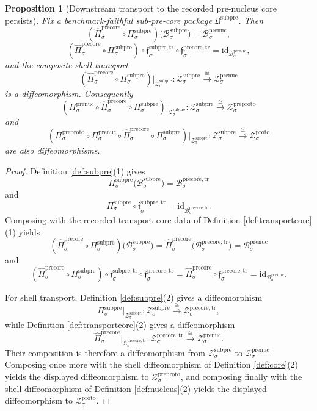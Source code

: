 \documentclass[11pt]{article}
\newcommand{\ProtoShellSet}[1]{\mathcal Z_{#1}^{\mathrm{proto}}}
\newcommand{\PreProtoProj}[1]{\Pi_{#1}^{\mathrm{preproto}}}
\newcommand{\PreProtoShellSet}[1]{\mathcal Z_{#1}^{\mathrm{preproto}}}
\newcommand{\PreNucBody}[1]{\mathcal B_{#1}^{\mathrm{prenuc}}}
\newcommand{\PreNucProj}[1]{\Pi_{#1}^{\mathrm{prenuc}}}
\newcommand{\PreNucShellSet}[1]{\mathcal Z_{#1}^{\mathrm{prenuc}}}
\newcommand{\PreCoreTrBody}[1]{\mathcal B_{#1}^{\mathrm{precore,tr}}}
\newcommand{\PreCoreTrProj}[1]{\widehat{\Pi}_{#1}^{\mathrm{precore}}}
\newcommand{\PreCoreTrLift}[1]{\mathfrak f_{#1}^{\mathrm{precore,tr}}}
\newcommand{\PreCoreTrShell}[1]{\mathcal Z_{#1}^{\mathrm{precore,tr}}}
\newcommand{\SubPreCorePackage}{\mathfrak U^{\mathrm{subpre}}}
\newcommand{\SubPreCoreBody}[1]{\mathcal B_{#1}^{\mathrm{subpre}}}
\newcommand{\SubPreCoreProj}[1]{\Pi_{#1}^{\mathrm{subpre}}}
\newcommand{\SubPreCoreTransportMin}[1]{\mathfrak f_{#1}^{\mathrm{subpre,tr}}}
\newcommand{\SubPreCoreShellSet}[1]{\mathcal Z_{#1}^{\mathrm{subpre}}}
\newtheorem{proposition}{Proposition}
\begin{document}
\begin{proposition}[Downstream transport to the recorded pre-nucleus core persists]
\label{prop:downstream}
Fix a benchmark-faithful sub-pre-core package \(\SubPreCorePackage\). Then
\[
(\PreCoreTrProj{\sigma}\circ\SubPreCoreProj{\sigma})\bigl(\SubPreCoreBody{\sigma}\bigr)
=
\PreNucBody{\sigma},
\]
\[
(\PreCoreTrProj{\sigma}\circ\SubPreCoreProj{\sigma})\circ
\SubPreCoreTransportMin{\sigma}\circ\PreCoreTrLift{\sigma}
=
\mathrm{id}_{\PreNucBody{\sigma}},
\]
and the composite shell transport
\[
(\PreCoreTrProj{\sigma}\circ\SubPreCoreProj{\sigma})\big|_{\SubPreCoreShellSet{\sigma}}
:
\SubPreCoreShellSet{\sigma}
\xrightarrow{\cong}
\PreNucShellSet{\sigma}
\]
is a diffeomorphism. Consequently
\[
(\PreNucProj{\sigma}\circ\PreCoreTrProj{\sigma}\circ\SubPreCoreProj{\sigma})\big|_{\SubPreCoreShellSet{\sigma}}
:
\SubPreCoreShellSet{\sigma}
\xrightarrow{\cong}
\PreProtoShellSet{\sigma}
\]
and
\[
(\PreProtoProj{\sigma}\circ\PreNucProj{\sigma}\circ\PreCoreTrProj{\sigma}\circ\SubPreCoreProj{\sigma})\big|_{\SubPreCoreShellSet{\sigma}}
:
\SubPreCoreShellSet{\sigma}
\xrightarrow{\cong}
\ProtoShellSet{\sigma}
\]
are also diffeomorphisms.
\end{proposition}

\begin{proof}
Definition \ref{def:subpre}(1) gives
\[
\SubPreCoreProj{\sigma}\bigl(\SubPreCoreBody{\sigma}\bigr)=\PreCoreTrBody{\sigma}
\]
and
\[
\SubPreCoreProj{\sigma}\circ\SubPreCoreTransportMin{\sigma}
=
\mathrm{id}_{\PreCoreTrBody{\sigma}}.
\]
Composing with the recorded transport-core data of Definition \ref{def:transportcore}(1) yields
\[
(\PreCoreTrProj{\sigma}\circ\SubPreCoreProj{\sigma})\bigl(\SubPreCoreBody{\sigma}\bigr)
=
\PreCoreTrProj{\sigma}\bigl(\PreCoreTrBody{\sigma}\bigr)
=
\PreNucBody{\sigma}
\]
and
\[
(\PreCoreTrProj{\sigma}\circ\SubPreCoreProj{\sigma})\circ
\SubPreCoreTransportMin{\sigma}\circ\PreCoreTrLift{\sigma}
=
\PreCoreTrProj{\sigma}\circ\PreCoreTrLift{\sigma}
=
\mathrm{id}_{\PreNucBody{\sigma}}.
\]

For shell transport, Definition \ref{def:subpre}(2) gives a diffeomorphism
\[
\SubPreCoreProj{\sigma}\big|_{\SubPreCoreShellSet{\sigma}}
:
\SubPreCoreShellSet{\sigma}
\xrightarrow{\cong}
\PreCoreTrShell{\sigma},
\]
while Definition \ref{def:transportcore}(2) gives a diffeomorphism
\[
\PreCoreTrProj{\sigma}\big|_{\PreCoreTrShell{\sigma}}
:
\PreCoreTrShell{\sigma}
\xrightarrow{\cong}
\PreNucShellSet{\sigma}.
\]
Their composition is therefore a diffeomorphism from \(\SubPreCoreShellSet{\sigma}\) to \(\PreNucShellSet{\sigma}\). Composing once more with the shell diffeomorphism of Definition \ref{def:core}(2) yields the displayed diffeomorphism to \(\PreProtoShellSet{\sigma}\), and composing finally with the shell diffeomorphism of Definition \ref{def:nucleus}(2) yields the displayed diffeomorphism to \(\ProtoShellSet{\sigma}\).
\end{proof}
\end{document}
